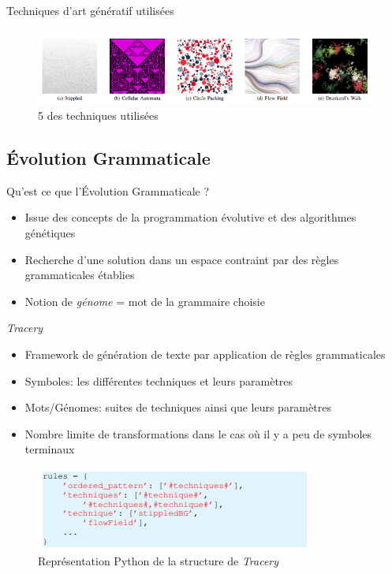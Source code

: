 \documentclass[aspectratio=169]{beamer}
\begin{document}
\begin{frame}{Techniques d'art génératif utilisées}
    \begin{figure}
        \centering
        \includegraphics[scale=0.7]{fig/techniques.png}
        \caption{5 des techniques utilisées}
    \end{figure}
\end{frame}

\subsection{Évolution Grammaticale}

\begin{frame}{Qu'est ce que l'Évolution Grammaticale ?}
    \begin{itemize}
        \item Issue des concepts de la programmation évolutive et des algorithmes génétiques
        \item Recherche d'une solution dans un espace contraint par des règles grammaticales établies 
        \item Notion de \textit{génome} = mot de la grammaire choisie 
    \end{itemize}
\end{frame}

\begin{frame}{\textit{Tracery}}
    \begin{itemize}
        \item Framework de génération de texte par application de règles grammaticales
        \item Symboles: les différentes techniques et leurs paramètres
        \item Mots/Génomes: suites de techniques ainsi que leurs paramètres
        \item Nombre limite de transformations dans le cas où il y a peu de symboles terminaux
    \end{itemize}
    \begin{figure}
        \centering
        \includegraphics[scale=0.8]{fig/pythonGrammar.png}
        \caption{Représentation Python de la structure de \textit{Tracery}}
    \end{figure}
\end{frame}
\end{document}
